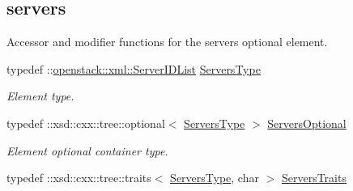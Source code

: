 \subsection*{servers}
\label{_amgrpd5539eb16678d66fe84f71ef4e139fad}
Accessor and modifier functions for the servers optional element. \begin{DoxyCompactItemize}
\item 
\hypertarget{classopenstack_1_1xml_1_1SharedIpGroup_a4c70d39bf8196dcaf3f623c02abe35df}{
typedef ::\hyperlink{classopenstack_1_1xml_1_1ServerIDList}{openstack::xml::ServerIDList} \hyperlink{classopenstack_1_1xml_1_1SharedIpGroup_a4c70d39bf8196dcaf3f623c02abe35df}{ServersType}}
\label{classopenstack_1_1xml_1_1SharedIpGroup_a4c70d39bf8196dcaf3f623c02abe35df}

\begin{DoxyCompactList}\small\item\em Element type. \item\end{DoxyCompactList}\item 
\hypertarget{classopenstack_1_1xml_1_1SharedIpGroup_a987e218ca594e96753368aa17270c78b}{
typedef ::xsd::cxx::tree::optional$<$ \hyperlink{classopenstack_1_1xml_1_1ServerIDList}{ServersType} $>$ \hyperlink{classopenstack_1_1xml_1_1SharedIpGroup_a987e218ca594e96753368aa17270c78b}{ServersOptional}}
\label{classopenstack_1_1xml_1_1SharedIpGroup_a987e218ca594e96753368aa17270c78b}

\begin{DoxyCompactList}\small\item\em Element optional container type. \item\end{DoxyCompactList}\item 
\hypertarget{classopenstack_1_1xml_1_1SharedIpGroup_a4b825c5b81a9ff8e231d08b4e5b429dd}{
typedef ::xsd::cxx::tree::traits$<$ \hyperlink{classopenstack_1_1xml_1_1ServerIDList}{ServersType}, char $>$ \hyperlink{classopenstack_1_1xml_1_1SharedIpGroup_a4b825c5b81a9ff8e231d08b4e5b429dd}{ServersTraits}}
\label{classopenstack_1_1xml_1_1SharedIpGroup_a4b825c5b81a9ff8e231d08b4e5b429dd}


\end{DoxyCompactItemize}

